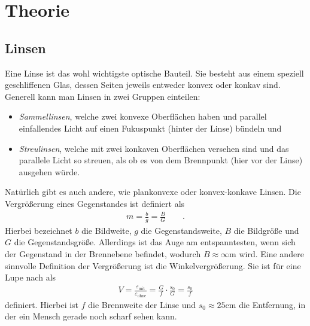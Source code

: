 \documentclass[12pt,a4paper,titlepage,headinclude,bibtotoc]{scrartcl}
\begin{document}
\section{Theorie}
\label{sec:theorie}


\subsection{Linsen}
Eine Linse ist das wohl wichtigste optische Bauteil.
Sie besteht aus einem speziell geschliffenen Glas, dessen Seiten jeweils entweder konvex oder konkav sind.
Generell kann man Linsen in zwei Gruppen einteilen:
\begin{itemize}
\item \emph{Sammellinsen}, welche zwei konvexe Oberflächen haben und parallel einfallendes Licht auf einen Fukuspunkt (hinter der Linse) bündeln und
\item \emph{Streulinsen}, welche mit zwei konkaven Oberflächen versehen sind und das parallele Licht so streuen, als ob es von dem Brennpunkt (hier vor der Linse) ausgehen würde.
\end{itemize}
Natürlich gibt es auch andere, wie plankonvexe oder konvex-konkave Linsen.
Die Vergrößerung eines Gegenstandes ist definiert als 
\begin{align}
m=\frac{b}{g}=\frac{B}{G}\qquad .\label{eq:vergr}
\end{align}
Hierbei bezeichnet $b$ die Bildweite, $g$ die Gegenstandsweite, $B$ die Bildgröße und $G$ die Gegenstandsgröße.
Allerdings ist das Auge am entspanntesten, wenn sich der Gegenstand in der Brennebene befindet, wodurch $B\approx\infty \si\metre$ wird.
Eine andere sinnvolle Definition der Vergrößerung ist die Winkelvergrößerung.
Sie ist für eine Lupe nach \cite[S.362]{demtroeder2} als
\begin{align}
V=\frac{\varepsilon_\text{mit}}{\varepsilon_\text{ohne}}=\frac{G}{f}\cdot\frac{s_0}{G}=\frac{s_0}{f}\label{eq:winkelvergr}
\end{align}
definiert.
Hierbei ist $f$ die Brennweite der Linse und $s_0\approx 25\si{\centi\meter}$ die Entfernung, in der ein Mensch gerade noch scharf sehen kann.
\end{document}
